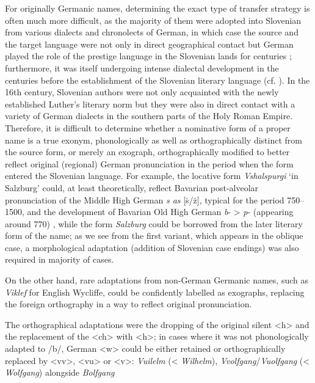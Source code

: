 \documentclass[output=paper,colorlinks,citecolor=brown,arabicfont,chinesefont]{langscibook}
\begin{document}
For originally Germanic names, determining the exact type of transfer strategy is often much more difficult, as the majority of them were adopted into Slovenian from various dialects and chronolects of German, in which case the source and the target language were not only in direct geographical contact but German played the role of the prestige language in the Slovenian lands for centuries \parencites[17--20]{Ahacic2014}[590--591]{Javor2012}; furthermore, it was itself undergoing intense dialectal development in the centuries before the establishment of the Slovenian literary language (cf. \citealt{Sekli2020}). In the 16th century, Slovenian authors were not only acquainted with the newly established Luther’s literary norm but they were also in direct contact with a variety of German dialects in the southern parts of the Holy Roman Empire. Therefore, it is difficult to determine whether a nominative form of a proper name is a true exonym, phonologically as well as orthographically distinct from the source form, or merely an exograph, orthographically modified to better reflect original  (regional) German pronunciation in the period when the form entered the Slovenian language. For example, the locative form \emph{Vshalspurgi} ‘in Salzburg’ could, at least theoretically, reflect Bavarian post-alveolar pronunciation of the Middle High German \emph{s as} [ṡ/ż], typical for the period 750–1500, and the development of Bavarian Old High German \emph{b}- > \emph{p}- (appearing around 770) \citep[10]{Sekli2020}, while the form \emph{Salzburg} could be borrowed from the later literary form of the name; as we see from the first variant, which appears in the oblique case, a morphological adaptation (addition of Slovenian case endings) was also required in majority of cases. 

On the other hand, rare adaptations from non-German Germanic names, such as \emph{Viklef} for English Wycliffe, could be confidently labelled as exographs, replacing the foreign orthography in a way to reflect original pronunciation. 

The orthographical adaptations were the dropping of the original silent <h> and the replacement of the <ch> with <h>; in cases where it was not phonologically adapted to /b/, German <w> could be either retained or orthographically replaced by <vv>, <vu> or <v>:  \emph{Vuilelm} (< \emph{Wilhelm}), \emph{Vvolfgang}/\emph{Vuolfgang} (< \emph{Wolfgang}) alongside \emph{Bolfgang}
\end{document}
